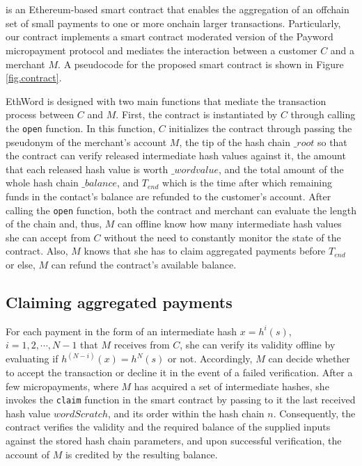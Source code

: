 
\section{\ew}

\ew is an Ethereum-based smart contract that enables the aggregation of an offchain set of small payments to one or more onchain larger transactions. Particularly, our contract implements a smart contract moderated version of the Payword micropayment protocol and mediates the interaction between a customer $C$ and a merchant $M$. A pseudocode for the proposed smart contract is shown in Figure \ref{fig.contract}. 


EthWord is designed with two main functions that mediate the transaction process between $C$ and $M$. First, the contract is instantiated by $C$ through calling the \texttt{open} function. In this function, $C$ initializes the contract through passing the pseudonym of the merchant's account $M$, the tip of the hash chain $\_root$ so that the contract can verify released intermediate hash values against it, the amount that each released hash value is worth $\_wordvalue$, and the total amount of the whole hash chain $\_balance$, and $T_{end}$ which is the time after which remaining funds in the contact's balance are refunded to the customer's account. After calling the \texttt{open} function, both the contract and merchant can evaluate the length of the chain and, thus, $M$ can offline know how many intermediate hash values she can accept from $C$ without the need to constantly monitor the state of the contract. Also, $M$ knows that she has to claim aggregated payments before $T_{end}$ or else, $M$ can refund the contract's available balance.

\subsection{Claiming aggregated payments} 

For each payment in the form of an intermediate hash $x=h^i(s)$, $i=1,2,\cdots,N-1$ that $M$ receives from $C$, she can verify its validity offline by evaluating if $h^{(N-i)}(x) = h^N(s)$ or not. Accordingly, $M$ can decide whether to accept the transaction or decline it in the event of a failed verification. After a few micropayments, where $M$ has acquired a set of intermediate hashes, she invokes the \texttt{claim} function in the smart contract by passing to it the last received hash value $wordScratch$, and its order within the hash chain $n$. Consequently, the contract verifies the validity and the required balance of the supplied inputs against the stored hash chain parameters, and upon successful verification, the account of $M$ is credited by the resulting balance.


